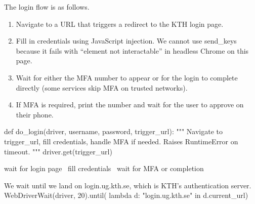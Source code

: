 The login flow is as follows.
\begin{enumerate}
\item Navigate to a URL that triggers a redirect to the KTH login page.
\item Fill in credentials using JavaScript injection.
  We cannot use {\Tt{}send{\_}keys\nwendquote} because it fails with
  \enquote{element not interactable} in headless Chrome on this page.
\item Wait for either the MFA number to appear or for the login to
  complete directly (some services skip MFA on trusted networks).
\item If MFA is required, print the number and wait for the user to
  approve on their phone.
\end{enumerate}
\nwenddocs{}\endmoddef\nwstartdeflinemarkup{}\nwenddeflinemarkup
def do_login(driver, username, password, trigger_url):
  """
  Navigate to trigger_url, fill credentials, handle MFA if needed.
  Raises RuntimeError on timeout.
  """
  driver.get(trigger_url)

  \LA{}wait for login page~{\nwtagstyle{}}\RA{}
  \LA{}fill credentials~{\nwtagstyle{}}\RA{}
  \LA{}wait for MFA or completion~{\nwtagstyle{}}\RA{}
\nwendcode{}\nwdocspar

We wait until we land on {\Tt{}login.ug.kth.se\nwendquote}, which is KTH's
authentication server.
\nwenddocs{}\endmoddef\nwstartdeflinemarkup{}\nwenddeflinemarkup
WebDriverWait(driver, 20).until(
  lambda d: "login.ug.kth.se" in d.current_url)
\nwendcode{}\nwdocspar

